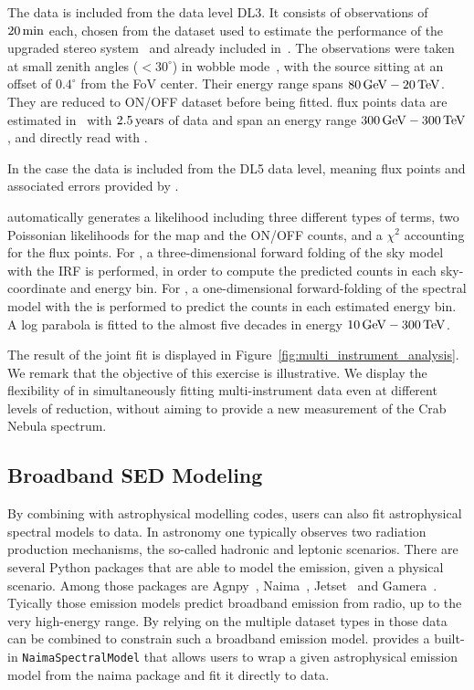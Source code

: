\documentclass[traditabstract, longauth]{aa}
\newcommand{\code}[1]{\texttt{#1}}
\begin{document}
The \magic data is included from the data level DL3. It consists of %
observations of $20\,{\rm min}$ each, chosen from the dataset used to estimate
the performance of the upgraded stereo system~\citep{magic_performance} and
already included in~\cite{joint_crab}. The observations were taken at small
zenith angles ($<30^{\circ}$) in wobble mode~\citep{fomin_1994}, with the
source sitting at an offset of $0.4^{\circ}$ from the FoV center. Their energy
range spans $80\,{\rm GeV} - 20\,{\rm TeV}$. They are reduced to ON/OFF
dataset before being fitted. \hawc flux points data are estimated
in~\cite{hawc_crab_2019} with $2.5\,{\rm years}$ of data and span an energy
range $300\,{\rm GeV} - 300\,{\rm TeV}$, and directly read with \gammapy.

In the case the \hawc data is included from the DL5 data level, meaning
flux points and associated errors provided by \cite{hawc_crab_2019}.

\gammapy automatically generates a likelihood including three different types
of terms, two Poissonian likelihoods for the \fermi map and the
ON/OFF counts, and a $\chi^2$ accounting for the \hawc flux points. For \fermi, a 
three-dimensional forward folding of the sky model with the IRF is performed,
in order to compute the predicted counts in each sky-coordinate and energy bin.
For \magic, a one-dimensional forward-folding of the spectral model with the
\irfs is performed to predict the counts in each estimated energy bin. A log
parabola is fitted to the almost five decades in energy $10\,{\rm GeV} -
	300\,{\rm TeV}$. %

The result of the joint fit is displayed in
Figure~\ref{fig:multi_instrument_analysis}. We remark that the objective of this
exercise is illustrative. We display the flexibility of \gammapy in
simultaneously fitting multi-instrument data even at different levels of
reduction, without aiming to provide a new measurement of the Crab Nebula
spectrum.


\subsection{Broadband SED Modeling}
\label{ssec:broadband-sed-modeling}
By combining \gammapy with astrophysical modelling codes, users can also fit
astrophysical spectral models to \gammaray data. In \gammaray
astronomy one typically observes two radiation production
mechanisms, the so-called hadronic and leptonic scenarios.
There are several Python packages that are able to model
the \gammaray emission, given a physical scenario. Among those
packages are  Agnpy~\citep{agnpy}, Naima~\citep{naima}, Jetset~\citep{jetset}
and Gamera~\citep{gamera}.
Tyically those emission models predict broadband emission from
radio, up to the very high-energy \gammaray range.
By relying on the multiple dataset types in \gammapy those
data can be combined to constrain such a broadband emission model.
\gammapy provides a built-in \code{NaimaSpectralModel} that allows
users to wrap a given astrophysical emission model from the
naima package and fit it directly to \gammaray data.
\end{document}
